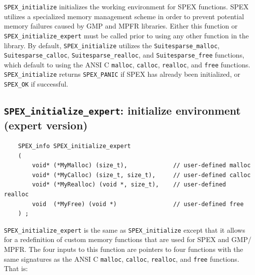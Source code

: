 \documentclass[12pt,oneside]{book}
\theoremstyle{definition}
\begin{document}
\verb|SPEX_initialize| initializes the working environment for SPEX
functions.  SPEX utilizes a specialized memory management scheme in order to
prevent potential memory failures caused by GMP and MPFR libraries.  Either
this function or \verb|SPEX_initialize_expert| must be called prior to using
any other function in the library.  By default, \verb|SPEX_initialize| utilizes 
the \verb'Suitesparse_malloc', \verb'Suitesparse_calloc', \verb'Suitesparse_realloc', and \newline 
\verb'Suitesparse_free' functions, which default to using the ANSI C \verb'malloc', \verb'calloc', \verb'realloc', and \verb'free' functions. \verb'SPEX_initialize' returns \verb|SPEX_PANIC| 
if SPEX has already been initialized, or \verb|SPEX_OK| if successful.


\subsection{\texttt{SPEX\_initialize\_expert}: initialize environment (expert version)} \label{ss:SPEX_initialize_expert}
\begin{mdframed}[userdefinedwidth=\textwidth]
{\footnotesize
\begin{verbatim}
    SPEX_info SPEX_initialize_expert
    (
        void* (*MyMalloc) (size_t),             // user-defined malloc
        void* (*MyCalloc) (size_t, size_t),     // user-defined calloc
        void* (*MyRealloc) (void *, size_t),    // user-defined realloc
        void  (*MyFree) (void *)                // user-defined free
    ) ;
\end{verbatim}
} \end{mdframed}

\verb|SPEX_initialize_expert| is the same as \verb|SPEX_initialize| except that
it allows for a redefinition of custom memory functions that are used for SPEX
and GMP/ MPFR.  The four inputs to this function are pointers to four
functions with the same signatures as the ANSI C \verb'malloc', \verb'calloc',
\verb'realloc', and \verb'free' functions.  That is:
\end{document}
